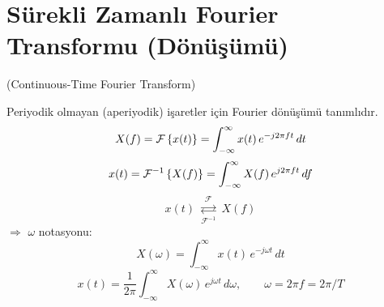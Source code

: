 \documentclass[11pt,a4paper]{article}
\begin{document}

\section{Sürekli Zamanlı Fourier Transformu (Dönüşümü)}
(Continuous-Time Fourier Transform)

Periyodik olmayan (aperiyodik) işaretler için Fourier dönüşümü tanımlıdır.
\[ X(f)=\mathcal{F}\left\{x(t)\right\}=\int_{-\infty}^{\infty} x(t)\,e^{-j2\pi ft}\,dt \]
\[ x(t)=\mathcal{F}^{-1}\left\{X(f)\right\}=\int_{-\infty}^{\infty} X(f)\,e^{j2\pi ft}\,df \]
\[ x(t)\ \underset{\mathcal{F}^{-1}}{\overset{\mathcal{F}}{\rightleftarrows}}\ X(f) \]
$\Rightarrow$ $\omega$ notasyonu:
\[ X(\omega)=\int_{-\infty}^{\infty} x(t)\,e^{-j\omega t}\,dt \]
\[ x(t)=\frac{1}{2\pi}\int_{-\infty}^{\infty} X(\omega)\,e^{j\omega t}\,d\omega, \qquad \omega=2\pi f=2\pi/T \]
\end{document}
